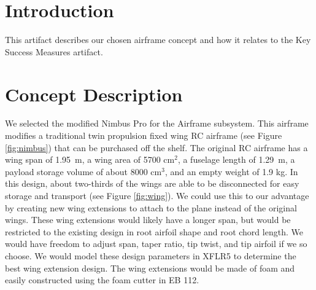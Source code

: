 \documentclass[]{auvsi_doc}
\begin{document}
\begin{AUVSITitlePage}
\begin{artifacttable}

\end{artifacttable}
\end{AUVSITitlePage}

\section{Introduction}

This artifact describes our chosen airframe concept and how it relates to the Key Success Measures artifact.

\section{Concept Description}

We selected the modified Nimbus Pro for the Airframe subsystem. This airframe modifies a traditional twin propulsion fixed wing RC airframe (see Figure \ref{fig:nimbus}) that can be purchased off the shelf. The original RC airframe has a wing span of 1.95~m, a wing area of 5700 cm$^2$, a fuselage length of 1.29~m, a payload storage volume of about 8000 cm$^3$, and an empty weight of 1.9 kg. In this design, about two-thirds of the wings are able to be disconnected for easy storage and transport (see Figure \ref{fig:wing}). We could use this to our advantage by creating new wing extensions to attach to the plane instead of the original wings. These wing extensions would likely have a longer span, but would be restricted to the existing design in root airfoil shape and root chord length. We would have freedom to adjust span, taper ratio, tip twist, and tip airfoil if we so choose. We would model these design parameters in XFLR5 to determine the best wing extension design. The wing extensions would be made of foam and easily constructed using the foam cutter in EB 112.
\end{document}
